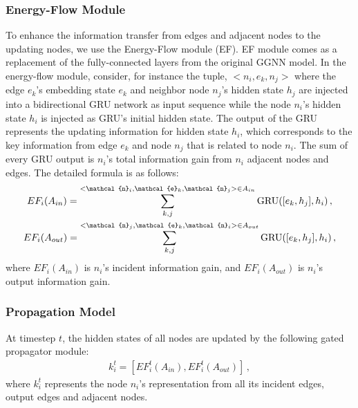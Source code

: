 \documentclass[letterpaper]{article} %
\begin{document}
\subsubsection{Energy-Flow Module}
To enhance the information transfer from edges and adjacent nodes to the updating nodes, we use the Energy-Flow module (EF).
EF module comes as a replacement of the fully-connected layers from the original GGNN model. 
In the energy-flow module, consider, for instance the tuple, $<{n}_i, {e}_k, {n}_j>$ where the edge ${e}_k$'s embedding state $e_k$ and neighbor node ${n}_j$'s hidden state $h_j$ are injected into a bidirectional GRU network as input sequence while the node ${n}_i$'s hidden state $h_i$ is injected as GRU's initial hidden state. 
The output of the GRU represents the updating information for hidden state $h_i$, which corresponds to the key information from edge ${e}_k$ and node ${n}_j$ that is related to node ${n}_i$. 
The sum of every GRU output is ${n}_i$'s total information gain from ${n}_i$ adjacent nodes and edges. 
The detailed formula is as follows:
\begin{gather}\notag
    EF_i(A_{in}) = \sum\limits_{k,j}^{<\mathcal{n}_i,\mathcal{e}_k,\mathcal{n}_j>\in A_{in}} \text{GRU}([e_k, h_j], h_i) \, , \\ \notag
    EF_i(A_{out}) = \sum\limits_{k,j}^{<\mathcal{n}_j,\mathcal{e}_k,\mathcal{n}_i>\in A_{out}} \text{GRU}([e_k, h_j], h_i) \, ,\notag
\end{gather}
where $EF_i(A_{in})$ is ${n}_i$'s incident information gain, and $EF_i(A_{out})$ is ${n}_i$'s output information gain.

\subsubsection{Propagation Model}

At timestep $t$, the hidden states of all nodes are updated by the following gated propagator module:
\begin{gather}
    k_{i}^t = [EF_i^t(A_{in}), EF_i^t(A_{out})] \, ,
\end{gather}
where $k_{i}^t$ represents the node ${n}_i$'s representation from all its incident edges, output edges and adjacent nodes.
\end{document}
